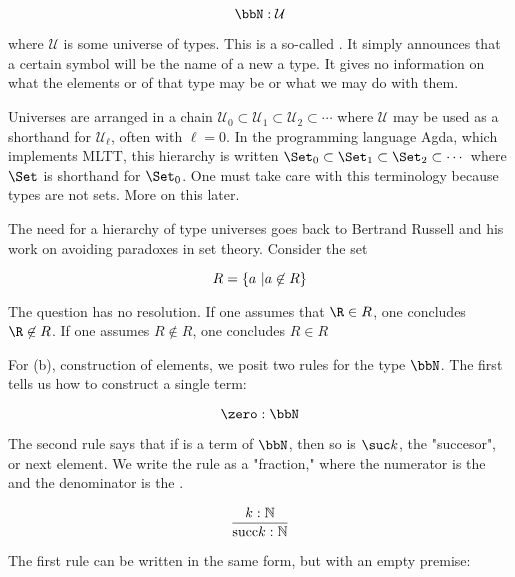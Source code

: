 \begin{equation}
\label{nat:intro}
\bbN: \mathcal{U}
\end{equation} 

where $\mathcal{U}$ is some universe of types.  This is a so-called .  It simply announces that a certain symbol will be the name of a new a type. It gives no information on what the elements or  of that type may be or what we may do with them.


 Universes are arranged in a chain $\mathcal{U_0} \subset \mathcal{U_1} \subset \mathcal{U_2} \subset \cdots$ where $\mathcal{U}$ may be used as a shorthand for $\mathcal{U_\ell}$, often with $\ell = 0$.  In the programming language Agda, which implements MLTT, this hierarchy is written $\Set_0 \subset \Set_1 \subset \Set_2 \subset \cdots$ where $\Set$ is shorthand for $\Set_0$.  One must take care with this terminology because types are not sets.  More on this later. 

The need for a hierarchy of type universes goes back to Bertrand Russell and his work on avoiding paradoxes in set theory.  Consider the set

\begin{equation}
\label{russell:set}
R = \{ a\ |\space a \not\in R \}
\end{equation}

The question  has no resolution.  If one assumes that $\R \in R$, one concludes $\R \not\in R$.  If one assumes $R \not\in R$, one concludes $R \in R$

For (b), construction of elements, we posit two rules for the type $\bbN$.  The first tells us how to construct a single term:

\begin{equation}
\label{construct-zero}
\zero : \bbN
\end{equation} 

The second rule says that if  is a term of $\bbN$, then so is $\suc k$, the "succesor", or next element.  We write the rule as a "fraction," where the numerator is the  and the denominator is the .

\begin{equation}
\label{construct-succ}
\frac{k: \mathbb{N}}{\text{succ}\space k : \mathbb{N}}
\end{equation}

The first rule can be written in the same form, but with an empty premise:

